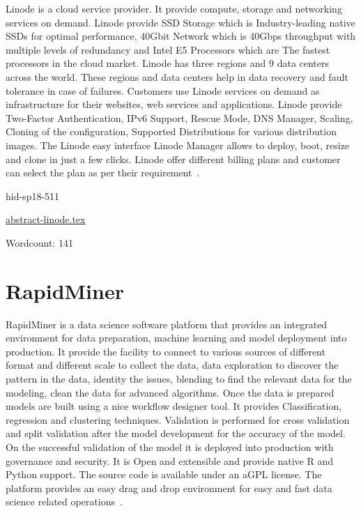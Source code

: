 Linode is a cloud service provider. It provide compute, storage and
networking services on demand. Linode provide SSD Storage which is
Industry-leading native SSDs for optimal performance, 40Gbit Network
which is 40Gbps throughput with multiple levels of redundancy and
Intel E5 Processors which are The fastest processors in the cloud
market. Linode has three regions and 9 data centers across the world.
These regions and data centers help in data recovery and fault
tolerance in case of failures. Customers use Linode services on demand
as infrastructure for their websites, web services and applications.
Linode provide Two-Factor Authentication, IPv6 Support, Rescue Mode, DNS Manager, Scaling, Cloning of the
configuration, Supported Distributions for various distribution
images. The Linode easy interface Linode Manager
allows to deploy, boot, resize and clone in just a few clicks. Linode
offer different billing plans and customer can select the plan as per
their requirement~\cite{hid-sp18-511-linode}.


\begin{IU}

hid-sp18-511

\href{https://github.com/cloudmesh-community/hid-sp18-511/blob/master//technology/abstract-linode.tex}{abstract-linode.tex}

 

Wordcount: 141

\end{IU}

\section{RapidMiner}

RapidMiner is a data science software platform that provides an
integrated environment for data preparation, machine
learning and model deployment into production.
It provide the facility to connect to various sources of different
format and different scale to collect the data, data exploration to
discover the pattern in the data, identity the issues, blending to
find the relevant data for the modeling, clean the data for advanced
algorithms. Once the data is prepared models are built using a nice
workflow designer tool. It provides Classification, regression and
clustering techniques. Validation is performed for cross validation
and split validation after the model development for the accuracy of
the model. On the successful validation of the model it is deployed
into production with governance and security. It is Open and
extensible and provide native R and Python support. The source code is
available under an aGPL license. The platform provides an easy drag
and drop environment for easy and fast data science related
operations~\cite{hid-sp18-511-rapidminer}.


